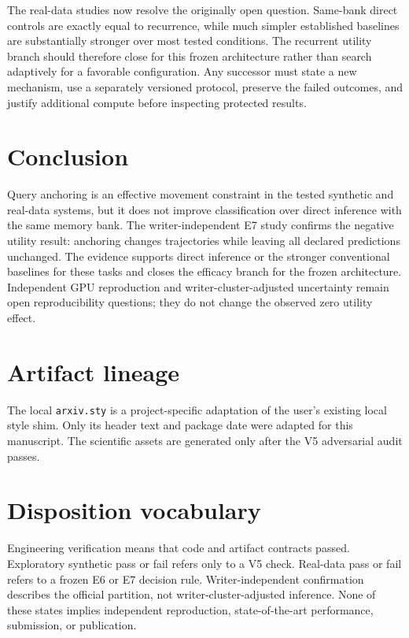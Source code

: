 \documentclass[11pt]{article}
\begin{document}
The real-data studies now resolve the originally open question. Same-bank direct controls are exactly equal to recurrence, while much simpler established baselines are substantially stronger over most tested conditions. The recurrent utility branch should therefore close for this frozen architecture rather than search adaptively for a favorable configuration. Any successor must state a new mechanism, use a separately versioned protocol, preserve the failed outcomes, and justify additional compute before inspecting protected results.

\section{Conclusion}
Query anchoring is an effective movement constraint in the tested synthetic and real-data systems, but it does not improve classification over direct inference with the same memory bank. The writer-independent E7 study confirms the negative utility result: anchoring changes trajectories while leaving all declared predictions unchanged. The evidence supports direct inference or the stronger conventional baselines for these tasks and closes the efficacy branch for the frozen architecture. Independent GPU reproduction and writer-cluster-adjusted uncertainty remain open reproducibility questions; they do not change the observed zero utility effect.




\appendix
\section{Artifact lineage}
The local \texttt{arxiv.sty} is a project-specific adaptation of the user's existing local style shim. Only its header text and package date were adapted for this manuscript. The scientific assets are generated only after the V5 adversarial audit passes.

\section{Disposition vocabulary}
Engineering verification means that code and artifact contracts passed. Exploratory synthetic pass or fail refers only to a V5 check. Real-data pass or fail refers to a frozen E6 or E7 decision rule. Writer-independent confirmation describes the official partition, not writer-cluster-adjusted inference. None of these states implies independent reproduction, state-of-the-art performance, submission, or publication.
\end{document}
